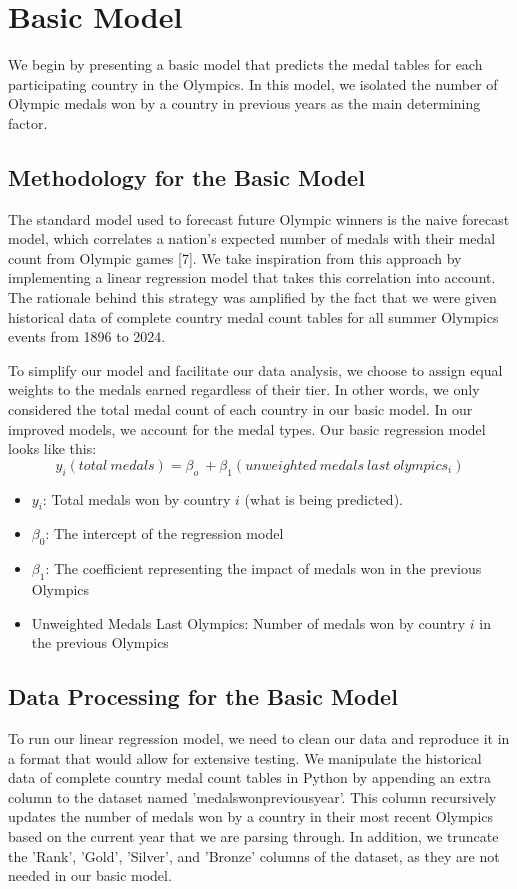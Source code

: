 \documentclass{mcmthesis}
\begin{document}
\section{Basic Model}
We begin by presenting a basic model that predicts the medal tables for each participating country in the Olympics. In this model, we isolated the number of Olympic medals won by a country in previous years as the main determining factor.

\subsection{Methodology for the Basic Model}
The standard model used to forecast future Olympic winners is the naive forecast model, which correlates a nation's expected number of medals with their medal count from Olympic games [7]. We take inspiration from this approach by implementing a linear regression model that takes this correlation into account. The rationale behind this strategy was amplified by the fact that we were given historical data of complete country medal count tables for all summer Olympics events from 1896 to 2024. \par
To simplify our model and facilitate our data analysis, we choose to assign equal weights to the medals earned regardless of their tier. In other words, we only considered the total medal count of each country in our basic model. In our improved models, we account for the medal types. Our basic regression model looks like this:
\begin{equation}
y_i(total\ medals) = \beta_o \ + \beta_1 (unweighted\ medals\ last\ olympics_i)
\end{equation} 

\begin{itemize}
    \item $y_i$: Total medals won by country $i$ (what is being predicted).
    \item $\beta_0$: The intercept of the regression model
    \item $\beta_1$: The coefficient representing the impact of medals won in the previous Olympics
    \item Unweighted Medals Last Olympics: Number of medals won by country $i$ in the previous Olympics
\end{itemize}

\subsection{Data Processing for the Basic Model}
To run our linear regression model, we need to clean our data and reproduce it in a format that would allow for extensive testing. We manipulate the historical data of complete country medal count tables in Python by appending an extra column to the dataset named 'medals\textunderscore won\textunderscore previous\textunderscore year'. This column recursively updates the number of medals won by a country in their most recent Olympics based on the current year that we are parsing through. In addition, we truncate the 'Rank', 'Gold', 'Silver', and 'Bronze' columns of the dataset, as they are not needed in our basic model. 
\end{document}
